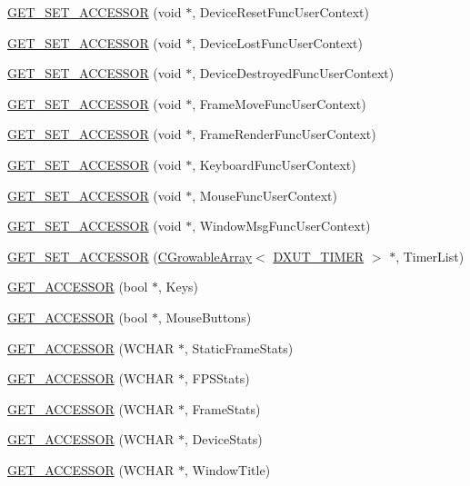 \begin{DoxyCompactItemize}
\item 
\hyperlink{class_d_x_u_t_state_abf5a46fd97695aa026000b33007fb938}{GET\_\-SET\_\-ACCESSOR} (void $\ast$, DeviceResetFuncUserContext)
\item 
\hyperlink{class_d_x_u_t_state_afa9670a8127b96cee9404703bb2b023c}{GET\_\-SET\_\-ACCESSOR} (void $\ast$, DeviceLostFuncUserContext)
\item 
\hyperlink{class_d_x_u_t_state_af72cbdb1d5611c2bc2a9fbd9f2cbc8e8}{GET\_\-SET\_\-ACCESSOR} (void $\ast$, DeviceDestroyedFuncUserContext)
\item 
\hyperlink{class_d_x_u_t_state_a651459e8ec073b9e117fc074f3b912b8}{GET\_\-SET\_\-ACCESSOR} (void $\ast$, FrameMoveFuncUserContext)
\item 
\hyperlink{class_d_x_u_t_state_a666a4dc6f80d57efdeb93bca8d8c5b0d}{GET\_\-SET\_\-ACCESSOR} (void $\ast$, FrameRenderFuncUserContext)
\item 
\hyperlink{class_d_x_u_t_state_aa4c17cd6e0f634979e9d8619ac3ac713}{GET\_\-SET\_\-ACCESSOR} (void $\ast$, KeyboardFuncUserContext)
\item 
\hyperlink{class_d_x_u_t_state_a28dca11fe4d9f6866e95ae7ac5315f64}{GET\_\-SET\_\-ACCESSOR} (void $\ast$, MouseFuncUserContext)
\item 
\hyperlink{class_d_x_u_t_state_a96022044bf967804215da24ffd507bb1}{GET\_\-SET\_\-ACCESSOR} (void $\ast$, WindowMsgFuncUserContext)
\item 
\hyperlink{class_d_x_u_t_state_a33e87175ee78c0a5dff55f181237d7a2}{GET\_\-SET\_\-ACCESSOR} (\hyperlink{class_c_growable_array}{CGrowableArray}$<$ \hyperlink{struct_d_x_u_t___t_i_m_e_r}{DXUT\_\-TIMER} $>$ $\ast$, TimerList)
\item 
\hyperlink{class_d_x_u_t_state_ac428f4c61a8d23b084a0b1c19cd0598e}{GET\_\-ACCESSOR} (bool $\ast$, Keys)
\item 
\hyperlink{class_d_x_u_t_state_a5e175783f28008da6fb627e41e7fb42b}{GET\_\-ACCESSOR} (bool $\ast$, MouseButtons)
\item 
\hyperlink{class_d_x_u_t_state_a10ba07c1ae189caa70da612eefa31398}{GET\_\-ACCESSOR} (WCHAR $\ast$, StaticFrameStats)
\item 
\hyperlink{class_d_x_u_t_state_ab396180bd85d5be854658da163a2c8ff}{GET\_\-ACCESSOR} (WCHAR $\ast$, FPSStats)
\item 
\hyperlink{class_d_x_u_t_state_aebdf3b3dfa93bd3cd58a3411e8f0b2f0}{GET\_\-ACCESSOR} (WCHAR $\ast$, FrameStats)
\item 
\hyperlink{class_d_x_u_t_state_a1695dda0b58c0780cc679c5c30fc0d8e}{GET\_\-ACCESSOR} (WCHAR $\ast$, DeviceStats)
\item 
\hyperlink{class_d_x_u_t_state_afc8f9df42d8ad7364a76afbc69a1c2ae}{GET\_\-ACCESSOR} (WCHAR $\ast$, WindowTitle)
\end{DoxyCompactItemize}
